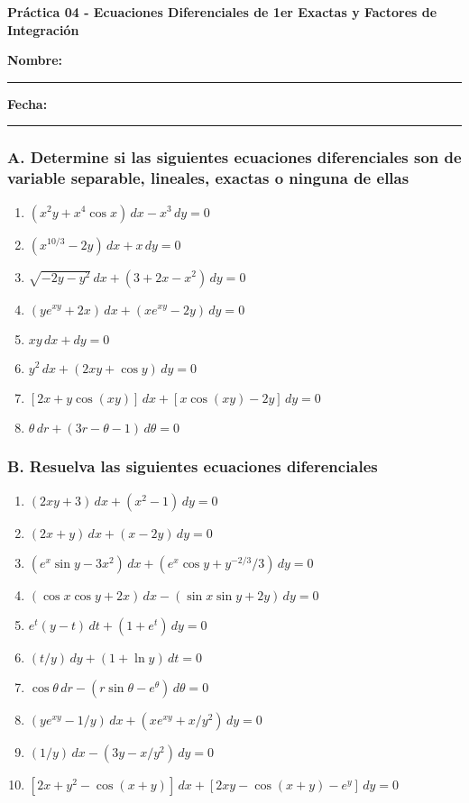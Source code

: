 \documentclass[a4paper,12pt]{article}
\begin{document}
\begin{center}
    \Large\textbf{Práctica 04 - Ecuaciones Diferenciales de 1er Exactas y Factores de Integración}\\[1cm]  

\end{center}
  \textbf{Nombre:} \rule{9cm}{0.4pt}  \textbf{Fecha:} \rule{4.5cm}{0.4pt}



\subsubsection*{A. Determine si las siguientes ecuaciones diferenciales son de variable separable, lineales, exactas o ninguna de ellas}

\begin{enumerate}
    \item \((x^2 y + x^4 \cos x) \, dx - x^3 \, dy = 0\)
    \item \((x^{10/3} - 2y) \, dx + x \, dy = 0\)
    \item \(\sqrt{-2y - y^2} \, dx + (3 + 2x - x^2) \, dy = 0\)
    \item \((y e^{xy} + 2x) \, dx + (x e^{xy} - 2y) \, dy = 0\)
    \item \(x y \, dx + dy = 0\)
    \item \(y^2 \, dx + (2xy + \cos y) \, dy = 0\)
    \item \([2x + y \cos(xy)] \, dx + [x \cos(xy) - 2y] \, dy = 0\)
    \item \(\theta \, dr + (3r - \theta - 1) \, d\theta = 0\)
\end{enumerate}

\subsubsection*{B. Resuelva las siguientes ecuaciones diferenciales}

\begin{enumerate}
    \item \((2xy + 3) \, dx + (x^2 - 1) \, dy = 0\)
    \item \((2x + y) \, dx + (x - 2y) \, dy = 0\)
    \item \((e^x \sin y - 3x^2) \, dx + (e^x \cos y + {y^{-2/3}/3}) \, dy = 0\)
    \item \((\cos x \cos y + 2x) \, dx - (\sin x \sin y + 2y) \, dy = 0\)
    \item \(e^t (y - t) \, dt + (1 + e^t) \, dy = 0\)
    \item \((t/y) \, dy + (1 + \ln y) \, dt = 0\)
    \item \(\cos \theta \, dr - (r \sin \theta - e^{\theta}) \, d\theta = 0\)
    \item \((y e^{xy} - 1/y) \, dx + (x e^{xy} + x/y^2) \, dy = 0\)
    \item \((1/y) \, dx - (3y - x/y^2) \, dy = 0\)
    \item \([2x + y^2 - \cos(x + y)] \, dx + [2xy - \cos(x + y) - e^y] \, dy = 0\)
\end{enumerate}
\end{document}
